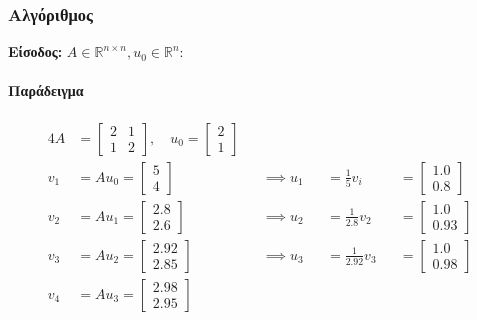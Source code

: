 \documentclass[11pt,a4paper,notitlepage,fleqn,final]{article}
\begin{document}
    \subsubsection{Αλγόριθμος}
    \textbf{Είσοδος:} \( A \in \mathbb R^{n\times n},
    u_0 \in \mathbb R^n \):

    \begin{algorithm}[H]
\end{algorithm}

\paragraph{Παράδειγμα}
\begin{alignat*}{4}
A&=\begin{bmatrix}
2&1\\1&2
\end{bmatrix},\quad u_0=\left[\begin{matrix}
2\\1
\end{matrix}\right] \\
v_1 &= Au_0 = \left[\begin{matrix}
5\\4
\end{matrix}\right] && \implies u_1 && = \frac{1}{5}v_i && = \left[
\begin{matrix}
1.0\\0.8
\end{matrix}\right] \\
v_2 &= Au_1 = \left[\begin{matrix}
2.8\\2.6
\end{matrix}\right] && \implies u_2 && = \frac{1}{2.8}v_2 && = \left[\begin{matrix}
1.0\\0.93
\end{matrix}\right] \\
v_3 &= Au_2 = \left[\begin{matrix}
2.92\\2.85
\end{matrix}\right] && \implies u_3 && = \frac{1}{2.92} v_3 && = \left[\begin{matrix}
1.0\\0.98
\end{matrix}\right] \\
v_4 &= Au_3 = \left[\begin{matrix}
2.98\\2.95
\end{matrix}\right]
\end{alignat*}
\end{document}
